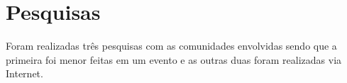 \chapter{Pesquisas}
\label{ape:pesquisas}

Foram realizadas três pesquisas com as comunidades envolvidas sendo que a primeira foi menor feitas em um evento e as outras duas foram realizadas via Internet.

\singlespacing


